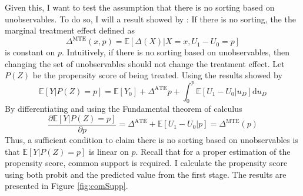 Given this, I want to test the assumption that there is no sorting based on unobservables. To do so, I will a result showed by \citet{Heckman05}: If there is no sorting, the the marginal treatment effect defined as 
\begin{equation*}
    \Delta^{\text{MTE}}(x,p) = \mathbb{E}\left[\Delta(X)\vert X=x, U_1-U_0=p\right]
\end{equation*}
is constant on $p$. Intuitively, if there is no sorting based on unobservables, then  changing  the set of unobservables should not change the treatment effect. Let $P(Z)$ be the propensity score of being treated. Using the results showed by \citet{Heckman05}
\begin{equation}\label{eq:func}
    \mathbb{E}[Y\vert P(Z)=p] = \mathbb{E}[Y_0] + \Delta^{\text{ATE}}p + \int_0^p\mathbb{E}[U_1-U_0\vert u_D]\mathrm{d}u_D
\end{equation}
By differentiating and using the Fundamental theorem of calculus
\begin{equation*}
    \frac{\partial\mathbb{E}[Y\vert P(Z)=p]}{\partial p} = \Delta^{\text{ATE}}+\mathbb{E}[U_1-U_0\vert p] = \Delta^{\text{MTE}}(p) 
\end{equation*}
Thus, a sufficient condition to claim there is no sorting based on unobservables is that $\mathbb{E}[Y\vert P(Z)=p]$ is linear on $p$. Recall that for a proper estimation of the propensity score, common support is required. I calculate the propensity score using both probit and the predicted value from the first stage. The results are presented in Figure \ref{fig:comSupp}.
